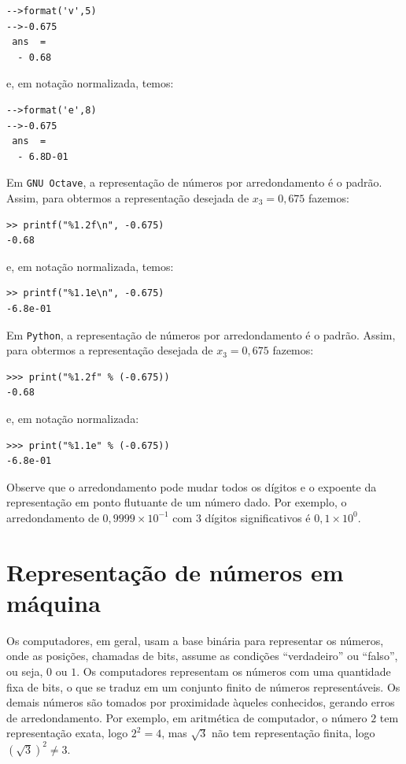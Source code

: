 \begin{sol}
\begin{itemize}
\begin{verbatim}
-->format('v',5)
-->-0.675
 ans  =
  - 0.68  
\end{verbatim}
e, em notação normalizada, temos:
\begin{verbatim}
-->format('e',8)
-->-0.675
 ans  =
  - 6.8D-01  
\end{verbatim}
\fi
\ifisoctave
Em \verb+GNU Octave+, a representação de números por arredondamento é o padrão. Assim, para obtermos a representação desejada de $x_3 = 0,675$ fazemos:
\begin{verbatim}
>> printf("%1.2f\n", -0.675)
-0.68
\end{verbatim}
e, em notação normalizada, temos:
\begin{verbatim}
>> printf("%1.1e\n", -0.675)
-6.8e-01
\end{verbatim}
\fi
\ifispython
Em \verb+Python+, a representação de números por arredondamento é o padrão. Assim, para obtermos a representação desejada de $x_3 = 0,675$ fazemos:
\begin{verbatim}
>>> print("%1.2f" % (-0.675))
-0.68  
\end{verbatim}
e, em notação normalizada:
\begin{verbatim}
>>> print("%1.1e" % (-0.675))
-6.8e-01  
\end{verbatim}
\fi
  \end{itemize}
\end{sol}

\begin{obs}
  Observe que o arredondamento pode mudar todos os dígitos e o expoente da representação em ponto flutuante de um número dado. Por exemplo, o arredondamento de $0,9999\times 10^{-1}$ com $3$ dígitos significativos é $0,1\times 10^{0}$.
\end{obs}


\section{Representação de números em máquina}

Os computadores, em geral, usam a base binária para representar os números, onde as posições, chamadas de bits, assume as condições ``verdadeiro'' ou ``falso'', ou seja, $0$ ou $1$. Os computadores representam os números com uma quantidade fixa de bits, o que se traduz em um conjunto finito de números representáveis. Os demais números são tomados por proximidade àqueles conhecidos, gerando erros de arredondamento. Por exemplo, em aritmética de computador, o número $2$ tem representação exata, logo $2^2=4$, mas $\sqrt{3}$ não tem representação finita, logo $(\sqrt{3})^2\neq 3$. 

